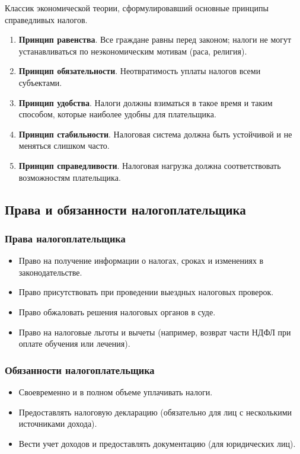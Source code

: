 \documentclass[12pt]{article}
\begin{document}
	\begin{person}
		Классик экономической теории, сформулировавший основные принципы справедливых налогов.
	\end{person}
	
	\begin{enumerate}
		\item \textbf{Принцип равенства}. Все граждане равны перед законом; налоги не могут устанавливаться по неэкономическим мотивам (раса, религия).
		\item \textbf{Принцип обязательности}. Неотвратимость уплаты налогов всеми субъектами.
		\item \textbf{Принцип удобства}. Налоги должны взиматься в такое время и таким способом, которые наиболее удобны для плательщика.
		\item \textbf{Принцип стабильности}. Налоговая система должна быть устойчивой и не меняться слишком часто.
		\item \textbf{Принцип справедливости}. Налоговая нагрузка должна соответствовать возможностям плательщика.
	\end{enumerate}
	
	\subsection{Права и обязанности налогоплательщика}
	
	\subsubsection{Права налогоплательщика}
	
	\begin{itemize}
		\item Право на получение информации о налогах, сроках и изменениях в законодательстве.
		\item Право присутствовать при проведении выездных налоговых проверок.
		\item Право обжаловать решения налоговых органов в суде.
		\item Право на налоговые льготы и вычеты (например, возврат части НДФЛ при оплате обучения или лечения).
	\end{itemize}
	
	\subsubsection{Обязанности налогоплательщика}
	
	\begin{itemize}
		\item Своевременно и в полном объеме уплачивать налоги.
		\item Предоставлять налоговую декларацию (обязательно для лиц с несколькими источниками дохода).
		\item Вести учет доходов и предоставлять документацию (для юридических лиц).
	\end{itemize}
	
\end{document}
